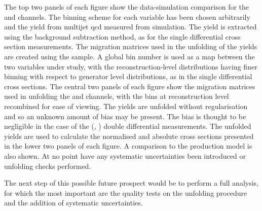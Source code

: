 The top two panels of each figure show the data-simulation comparison for the \eJets{} and \muJets{} channels.
The binning scheme for each variable has been chosen arbitrarily and the yield from multijet \acrshort{qcd} measured from simulation.
The \ttbar{} yield is extracted using the background subtraction method, as for the single differential cross section measurements.
The migration matrices used in the unfolding of the \ttbar{} yields are created using the \powhegpythia{} sample.
A global bin number is used as a map between the two variables under study, with the reconstruction-level distributions having finer binning with respect to generator level distributions, as in the single differential cross sections.
The central two panels of each figure show the migration matrices used in unfolding the \eJets{} and \muJets{} channels, with the bins at reconstruction level recombined for ease of viewing.
The \ttbar{} yields are unfolded without regularisation and so an unknown amount of bias may be present.
The bias is thought to be negligible in the case of the (\LPT{}, \LETA{}) double differential measurements.
The unfolded \ttbar{} yields are used to calculate the normalised and absolute cross sections presented in the lower two panels of each figure.
A comparison to the \powhegpythia{} \ttbar{} production model is also shown.
At no point have any systematic uncertainties been introduced or unfolding checks performed.

The next step of this possible future prospect would be to perform a full analysis, for which the most important are the quality tests on the unfolding procedure and the addition of systematic uncertainties.

